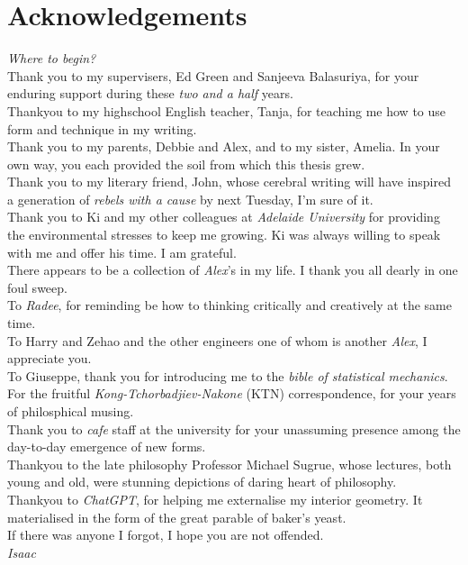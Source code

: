 \chapter{Acknowledgements}

\textit{Where to begin?}
\\
Thank you to my supervisers, Ed Green and Sanjeeva Balasuriya,
for your enduring support during these \textit{two and a half} 
years.
\\
Thankyou to my highschool English teacher, Tanja, for teaching
me how to use form and technique in my writing.
\\
Thank you to my parents, Debbie and Alex, and to my sister,
Amelia. In your own way, you each provided the soil 
from which this thesis grew.
\\
Thank you to my literary friend, John, whose cerebral writing 
will have inspired a generation of \textit{rebels with a cause} by 
next Tuesday, I'm sure of it.
\\
Thank you to Ki and my other colleagues at \textit{Adelaide University}
for providing the environmental stresses to keep me growing. Ki 
was always willing to speak with me and offer his time. 
I am grateful.
\\
There appears to be a collection of \textit{Alex}'s in my life.
I thank you all dearly in one foul sweep. 
\\
To \textit{Radee}, for reminding be how to thinking critically 
and creatively at the same time.
\\
To Harry and Zehao and the other engineers one of whom is another \textit{Alex},
I appreciate you.
\\
To Giuseppe, thank you for introducing me to the \textit{bible of statistical mechanics}.
\\
For the fruitful \textit{Kong-Tchorbadjiev-Nakone} (KTN) correspondence,
for your years of philosphical musing.
\\
Thank you to \textit{cafe} staff at the university for your 
unassuming presence among the day-to-day emergence of new forms.
\\
Thankyou to the late philosophy Professor Michael Sugrue,
whose lectures, both young and old, were stunning depictions
of daring heart of philosophy.
\\
Thankyou to \textit{ChatGPT},
for helping me externalise my interior geometry.
It materialised in the form of the great parable of baker's yeast.
\\
If there was anyone I forgot, I hope you are not offended.
\\

\textit{Isaac}
